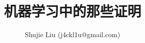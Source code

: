 \documentclass[12pt,a4paper,titlepage]{book}
\title{机器学习中的那些证明}
\author{Shujie Liu (j4ckl1u@gmail.com)}
\begin{document}
\begin{CJK*}{UTF8}{gbsn} 
\maketitle













\end{CJK*}
\end{document}
